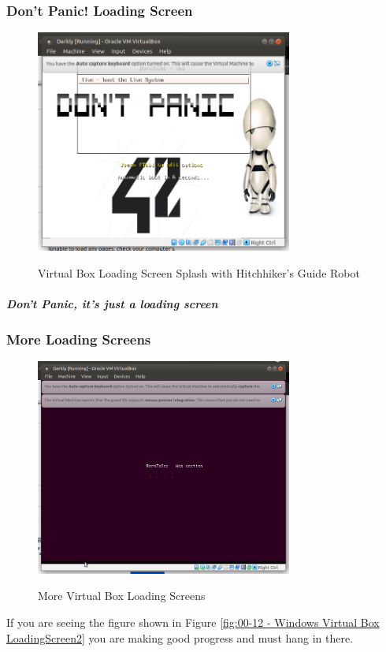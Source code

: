 \subsubsection{Don't Panic! Loading Screen}

\begin{figure}[!htb]
    \centering
    \includegraphics[width=0.752\textwidth]{images/00-11.png}\\[0cm]  
    \caption[Virtual Box]{Virtual Box Loading Screen Splash with Hitchhiker's Guide Robot}
    \label{fig:00-11 - Windows Virtual Box LoadingScreen1} 
\end{figure}
\subparagraph{Don't Panic, it's just a loading screen}

\subsubsection{More Loading Screens}
\begin{figure}[!htb]
    \centering
    \includegraphics[width=0.752\textwidth]{images/00-12.png}\\[0cm]  
    \caption[Virtual Box]{More Virtual Box Loading Screens}
    \label{fig:00-12 - Windows Virtual Box LoadingScreen2} 
\end{figure}
If you are seeing the figure shown in Figure \vref{fig:00-12 - Windows Virtual Box LoadingScreen2}
you are making good progress and must hang in there.

